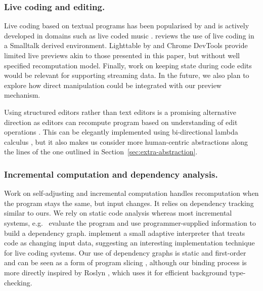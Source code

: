 \documentclass[acmsmall,anonymous,fleqn]{acmart}\settopmatter{printfolios=false,printccs=false,printacmref=false}
\theoremstyle{plain}
\theoremstyle{definition}
\begin{document}
\subsubsection*{Live coding and editing.}
Live coding based on textual programs has been popularised by \citet{principle,learnable} and
is actively developed in domains such as live coded music \cite{beyond,sonic}. \citet{liveroad}
reviews the use of live coding in a Smalltalk derived environment. Lighttable by \citet{lighttable}
and Chrome DevTools provide limited live previews akin to those presented in this paper,
but without well specified recomputation model. Finally, work on keeping state during
code edits \cite{alive,livingit} would be relevant for supporting streaming data. In the future,
we also plan to explore how direct manipulation \cite{direct} could be integrated with our preview
mechanism. \citet{liveroad}

Using structured editors \cite{structure-based} rather than text editors is a promising alternative
direction as editors can recompute program based on understanding of edit operations
\cite{interactive,livenut,lamdu}. This can be elegantly implemented using bi-directional
lambda calculus \cite{hazelnut}, but it also makes us consider more human-centric abstractions
\cite{subtext,directprog} along the lines of the one outlined in Section~\ref{sec:extra-abstraction}.

\subsubsection*{Incremental computation and dependency analysis.}
Work on self-adjusting and incremental computation \cite{selfadjusting,adapton} handles
recomputation when the program stays the same, but input changes. It relies on dependency tracking
similar to ours. We rely on static code analysis whereas most incremental systems,
e.g.~\cite{incremental,adaptivefp,deltaml} evaluate the program and use programmer-supplied
information to build a dependency graph. \citet{adapton} implement a small adaptive interpreter
that treats code as changing input data, suggesting an interesting implementation technique for
live coding systems. Our use of dependency graphs \cite{dependencies} is static and first-order
and can be seen as a form of program slicing \cite{slicing}, although our binding process is
more directly inspired by Roslyn \cite{roslyn}, which uses it for efficient background type-checking.
\end{document}
